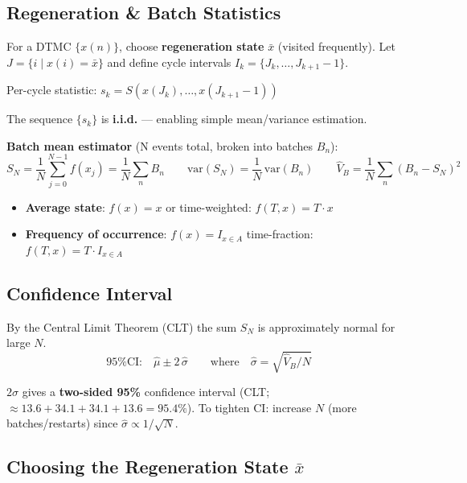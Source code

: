 \documentclass[10pt,a4paper]{article}
\begin{document}
\subsection*{Regeneration \& Batch Statistics}

For a DTMC $\{x(n)\}$, choose \textbf{regeneration state} $\bar{x}$ (visited frequently).
Let $J = \{i \mid x(i) = \bar{x}\}$ and define cycle intervals $I_k = \{J_k,\ldots,J_{k+1}-1\}$.
\medskip

Per-cycle statistic: $s_k = S(x(J_k),\ldots,x(J_{k+1}-1))$

The sequence $\{s_k\}$ is \textbf{i.i.d.} --- enabling simple mean/variance estimation.

\begin{defbox}
\textbf{Batch mean estimator} (N events total, broken into batches $B_n$):
\[
  S_N = \frac{1}{N}\sum_{j=0}^{N-1} f(x_j)
      = \frac{1}{N}\sum_n B_n
  \qquad
  \text{var}(S_N) = \frac{1}{N}\,\text{var}(B_n)
  \qquad
  \hat{V}_B = \frac{1}{N}\sum_n (B_n - S_N)^2
\]
\begin{itemize}
  \item \textbf{Average state}: $f(x) = x$ \quad or time-weighted: $f(T,x) = T\cdot x$
  \item \textbf{Frequency of occurrence}: $f(x) = I_{x\in A}$ \quad time-fraction: $f(T,x) = T\cdot I_{x\in A}$
\end{itemize}
\end{defbox}

\subsection*{Confidence Interval}

By the Central Limit Theorem (CLT) the sum $S_N$ is approximately normal for large $N$.
\[
  \text{95\% CI:}\quad \hat{\mu} \pm 2\,\hat{\sigma}
  \qquad\text{where}\quad \hat{\sigma} = \sqrt{\hat{V}_B/N}
\]

\begin{warnbox}
$2\sigma$ gives a \textbf{two-sided 95\%} confidence interval (CLT; $\approx 13.6+34.1+34.1+13.6 = 95.4\%$).
To tighten CI: increase $N$ (more batches/restarts) since $\hat{\sigma} \propto 1/\sqrt{N}$.
\end{warnbox}

\subsection*{Choosing the Regeneration State $\bar{x}$}
\end{document}
